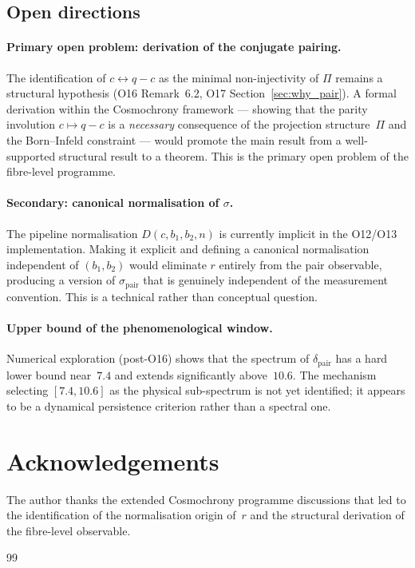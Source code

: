 \documentclass[11pt,a4paper]{article}
\theoremstyle{definition}
\begin{document}
    \subsection{Open directions}

      \paragraph{Primary open problem: derivation of the conjugate pairing.}
        The identification of $c \leftrightarrow q-c$ as the minimal
        non-injectivity of $\Pi$ remains a structural hypothesis
        (O16 Remark~6.2, O17 Section~\ref{sec:why_pair}).
        A formal derivation within the Cosmochrony framework ---
        showing that the parity involution $c \mapsto q-c$ is a
        \emph{necessary} consequence of the projection structure~$\Pi$
        and the Born--Infeld constraint --- would promote the main result
        from a well-supported structural result to a theorem.
        This is the primary open problem of the fibre-level programme.

      \paragraph{Secondary: canonical normalisation of $\sigma$.}
        The pipeline normalisation $D(c, b_1, b_2, n)$ is currently
        implicit in the O12/O13 implementation.
        Making it explicit and defining a canonical normalisation
        independent of $(b_1, b_2)$ would eliminate $r$ entirely from
        the pair observable, producing a version of $\sigma_{\mathrm{pair}}$
        that is genuinely independent of the measurement convention.
        This is a technical rather than conceptual question.

      \paragraph{Upper bound of the phenomenological window.}
        Numerical exploration (post-O16) shows that the spectrum
        of $\delta_{\mathrm{pair}}$ has a hard lower bound near~$7.4$
        and extends significantly above~$10.6$.
        The mechanism selecting $[7.4, 10.6]$ as the physical
        sub-spectrum is not yet identified; it appears to be a
        dynamical persistence criterion rather than a spectral one.

  \section*{Acknowledgements}

  The author thanks the extended Cosmochrony programme discussions
  that led to the identification of the normalisation origin of~$r$
  and the structural derivation of the fibre-level observable.

  
  \begin{thebibliography}{99}
    
  \end{thebibliography}
\end{document}
